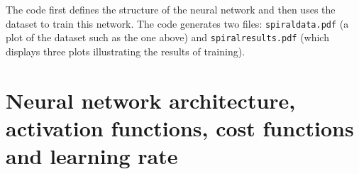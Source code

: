 \documentclass[letterpaper]{scrartcl}
\begin{document}
The code first defines the structure of the neural network 
and then uses the dataset to train this network.
The code generates two files: \texttt{spiral{\textunderscore}data.pdf} (a plot of the dataset such as the one above)
and \texttt{spiral{\textunderscore}results.pdf} (which displays three plots illustrating the results of training).

\section{Neural network architecture, activation functions, cost functions and learning rate}

\end{document}
